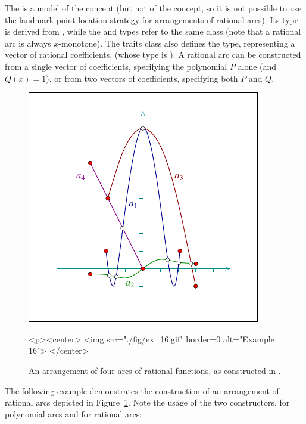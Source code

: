 The  is a model of the
 concept (but not of the
 concept, so it is not possible
to use the landmark point-location strategy for arrangements of
rational arcs). Its  type is derived from
, while the  and
 types refer to the same class (note that
a rational arc is always $x$-monotone). The traits class also
defines the  type, representing a vector of
rational coefficients, (whose type is ). A
rational arc can be constructed from a single vector of
coefficients, specifying the polynomial $P$ alone (and $Q(x) =
1$), or from two vectors of coefficients, specifying both $P$ and
$Q$.

\begin{figure}[t]
\begin{ccTexOnly}
  \begin{center}
  \includegraphics{Arrangement_on_surface_2/fig/ex_16}
  \end{center}
\end{ccTexOnly}
\begin{ccHtmlOnly}
  <p><center>
  <img src="./fig/ex_16.gif" border=0 alt="Example 16">
  </center>
\end{ccHtmlOnly}
\caption{An arrangement of four arcs of rational functions, as
constructed in .\label{arr_fig:ex_16}}
\end{figure}

The following example demonstrates the construction of an
arrangement of rational arcs depicted in
Figure~\ref{arr_fig:ex_16}. Note the usage of the two
constructors, for polynomial arcs and for rational arcs:

